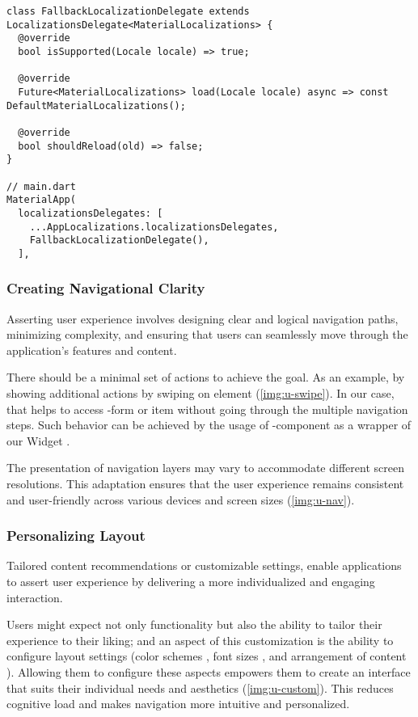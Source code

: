 \begin{lstlisting}
class FallbackLocalizationDelegate extends LocalizationsDelegate<MaterialLocalizations> {
  @override
  bool isSupported(Locale locale) => true;
  
  @override
  Future<MaterialLocalizations> load(Locale locale) async => const DefaultMaterialLocalizations();

  @override
  bool shouldReload(old) => false;
}

// main.dart
MaterialApp(
  localizationsDelegates: [
    ...AppLocalizations.localizationsDelegates,
    FallbackLocalizationDelegate(),
  ],
\end{lstlisting}


\subsubsection{Creating Navigational Clarity} 

Asserting user experience involves designing clear and logical navigation paths, minimizing complexity, and ensuring 
that users can seamlessly move through the application's features and content.

There should be a minimal set of actions to achieve the goal. As an example, by showing additional actions by swiping 
on element (\cref{img:u-swipe}). In our case, that helps to access -form or  item without going 
through the multiple navigation steps. Such behavior can be achieved by the usage of 
-component as a wrapper of our Widget .

The presentation of navigation layers may vary to accommodate different screen resolutions. This adaptation 
ensures that the user experience remains consistent and user-friendly across various devices and screen sizes 
(\cref{img:u-nav}).




\subsubsection{Personalizing Layout}

Tailored content recommendations or customizable settings, enable applications to assert user experience by delivering 
a more individualized and engaging interaction.

Users might expect not only functionality but also the ability to tailor their experience to their liking; and an 
aspect of this customization is the ability to configure layout settings (color schemes , font sizes 
, and arrangement of content ). Allowing them to configure these aspects empowers them to 
create an interface that suits their individual needs and aesthetics (\cref{img:u-custom}). This reduces cognitive 
load and makes navigation more intuitive and personalized.

